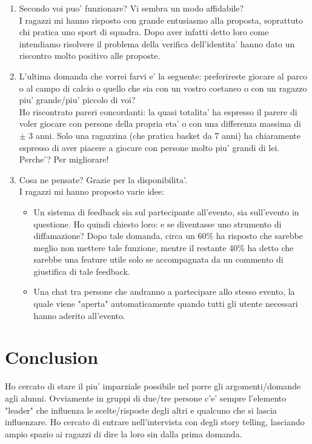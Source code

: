 \documentclass[12pt]{article}
\begin{document}
\begin{enumerate}
  \item Secondo voi puo' funzionare? Vi sembra un modo affidabile? \\
  I ragazzi mi hanno risposto con grande entusiasmo alla proposta, soprattuto chi pratica uno sport di squadra. Dopo aver infatti detto loro come intendiamo risolvere il problema della verifica dell'identita'
  hanno dato un riscontro molto positivo alle proposte.
  \item L'ultima domanda che vorrei farvi e' la seguente: preferireste giocare al parco o al campo di calcio o quello che sia con un vostro coetaneo o con un ragazzo piu'
  grande/piu' piccolo di voi? \\
  Ho riscontrato pareri concordanti: la quasi totalita' ha espresso il parere di voler giocare con persone della propria eta' o con una differenza massima di $\pm$ 3 anni. Solo una ragazzina (che pratica basket da 7 anni) ha chiaramente espresso di aver piacere a giocare
  con persone molto piu' grandi di lei. Perche'? Per migliorare!
  \item Cosa ne pensate? Grazie per la disponibilita'. \\
  I ragazzi mi hanno proposto varie idee:
  \begin{itemize}
    \item Un sistema di feedback sia sul partecipante all'evento, sia sull'evento in questione. Ho quindi chiesto loro: e se diventasse uno strumento di diffamazione? Dopo tale domanda, circa un 60\% ha risposto che sarebbe meglio non mettere
    tale funzione, mentre il restante 40\% ha detto che sarebbe una feature utile solo se accompagnata da un commento di giustifica di tale feedback.
    \item Una chat tra persone che andranno a partecipare allo stesso evento, la quale viene "aperta" automaticamente quando tutti gli utente necessari hanno aderito all'evento.
  \end{itemize}
\end{enumerate}

\section*{Conclusion}

Ho cercato di stare il piu' imparziale possibile nel porre gli argomenti/domande agli alunni. Ovviamente in gruppi di due/tre persone c'e' sempre l'elemento "leader" che influenza le scelte/risposte
degli altri e qualcuno che si lascia influenzare. Ho cercato di entrare nell'intervista con degli story telling, lasciando ampio spazio ai ragazzi di dire la loro sin dalla prima domanda.
\end{document}

